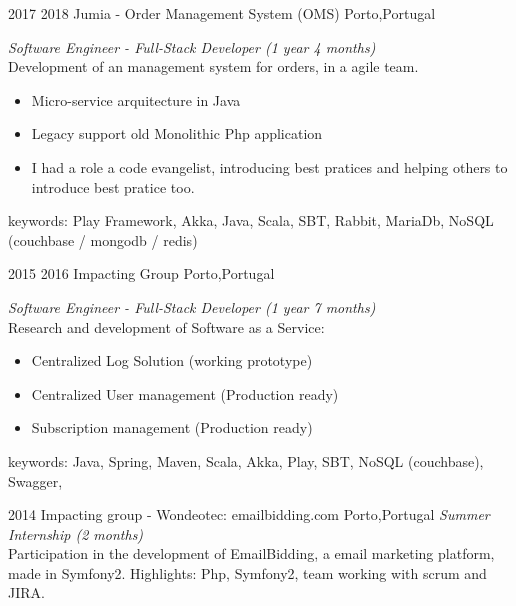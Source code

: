 \documentclass[]{friggeri-cv} %
\begin{document}
\begin{entrylist}
\entry
{2017 2018}
{Jumia - Order Management System (OMS) }
{Porto,Portugal}
{\emph{Software Engineer - Full-Stack Developer (1 year 4 months)} \\
Development of an management system for orders, in a agile team.
\begin{itemize}
 \item Micro-service arquitecture in Java
 \item Legacy support old Monolithic Php application
 \item I had a role a code evangelist, introducing best pratices and helping others to introduce best pratice too.

\end{itemize}
keywords: Play Framework, Akka, Java, Scala, SBT,  Rabbit, MariaDb, NoSQL (couchbase / mongodb / redis) 
}


\entry
{2015 2016}
{Impacting Group }
{Porto,Portugal}
{\emph{Software Engineer - Full-Stack Developer (1 year 7 months)} \\
Research and development of Software as a Service:
\begin{itemize}
 \item Centralized Log Solution (working prototype)
 \item Centralized User management (Production ready)
 \item Subscription management (Production ready)
\end{itemize}
keywords: Java, Spring, Maven, Scala, Akka, Play, SBT, NoSQL (couchbase), Swagger,
}

\entry
{2014}
{Impacting group - {\normalfont Wondeotec: emailbidding.com}}
{Porto,Portugal}
{\emph{Summer Internship (2 months)} \\
Participation in the development of EmailBidding, a email marketing platform, made in Symfony2. Highlights: Php, Symfony2, team working with scrum and JIRA.
}

\end{entrylist}
\end{document}
